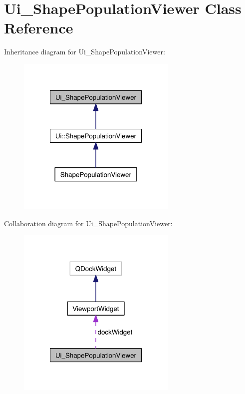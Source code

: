 \hypertarget{class_ui___shape_population_viewer}{\section{Ui\-\_\-\-Shape\-Population\-Viewer Class Reference}
\label{class_ui___shape_population_viewer}
}


Inheritance diagram for Ui\-\_\-\-Shape\-Population\-Viewer\-:\nopagebreak
\begin{figure}[H]
\begin{center}
\leavevmode
\includegraphics[width=216pt]{class_ui___shape_population_viewer__inherit__graph}
\end{center}
\end{figure}


Collaboration diagram for Ui\-\_\-\-Shape\-Population\-Viewer\-:\nopagebreak
\begin{figure}[H]
\begin{center}
\leavevmode
\includegraphics[width=216pt]{class_ui___shape_population_viewer__coll__graph}
\end{center}
\end{figure}
